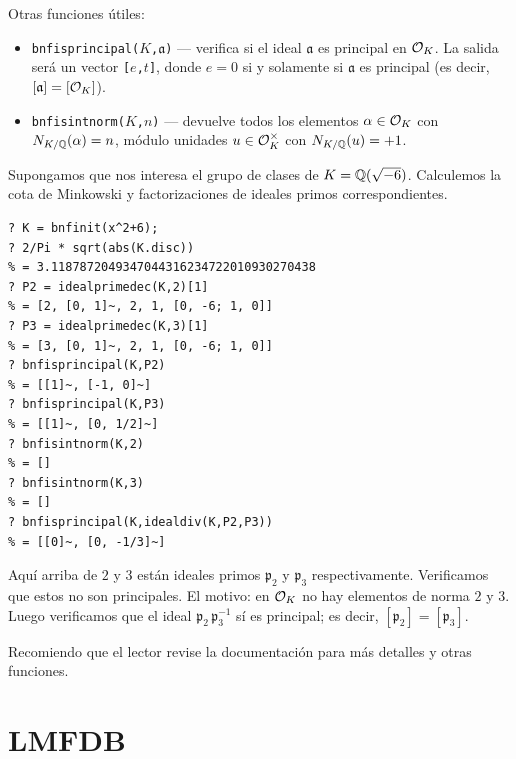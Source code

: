 Otras funciones útiles:
\begin{itemize}
\item \texttt{bnfisprincipal($K$,$\mathfrak{a}$)} --- verifica si el ideal
  $\mathfrak{a}$ es principal en $\mathcal{O}_K$. La salida será un vector
  \texttt{[$e$,$t$]}, donde $e = 0$ si y solamente si $\mathfrak{a}$ es
  principal (es decir, $[\mathfrak{a}] = [\mathcal{O}_K]$).

\item \texttt{bnfisintnorm($K$,$n$)} --- devuelve todos los elementos
  $\alpha \in \mathcal{O}_K$ con $N_{K/\mathbb{Q}} (\alpha) = n$, módulo unidades
  $u \in \mathcal{O}_K^\times$ con $N_{K/\mathbb{Q}} (u) = +1$.
\end{itemize}

\begin{ejemplo}
  Supongamos que nos interesa el grupo de clases de
  $K = \mathbb{Q} (\sqrt{-6})$. Calculemos la cota de Minkowski y factorizaciones de
  ideales primos correspondientes.

  \begin{shaded}
\begin{verbatim}
? K = bnfinit(x^2+6);
? 2/Pi * sqrt(abs(K.disc))
% = 3.1187872049347044316234722010930270438
? P2 = idealprimedec(K,2)[1]
% = [2, [0, 1]~, 2, 1, [0, -6; 1, 0]]
? P3 = idealprimedec(K,3)[1]
% = [3, [0, 1]~, 2, 1, [0, -6; 1, 0]]
? bnfisprincipal(K,P2)
% = [[1]~, [-1, 0]~]
? bnfisprincipal(K,P3)
% = [[1]~, [0, 1/2]~]
? bnfisintnorm(K,2)
% = []
? bnfisintnorm(K,3)
% = []
? bnfisprincipal(K,idealdiv(K,P2,P3))
% = [[0]~, [0, -1/3]~]
\end{verbatim}
  \end{shaded}

  Aquí arriba de $2$ y $3$ están ideales primos $\mathfrak{p}_2$ y
  $\mathfrak{p}_3$ respectivamente. Verificamos que estos no son principales.
  El motivo: en $\mathcal{O}_K$ no hay elementos de norma $2$ y $3$. Luego verificamos
  que el ideal $\mathfrak{p}_2\,\mathfrak{p}_3^{-1}$ sí es principal; es decir,
  $[\mathfrak{p}_2] = [\mathfrak{p}_3]$.
\end{ejemplo}

Recomiendo que el lector revise la documentación para más detalles y otras
funciones.


\section{LMFDB}

